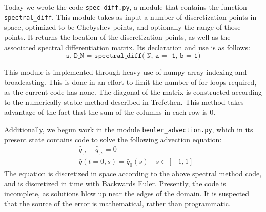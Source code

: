 
Today we wrote the code \texttt{spec\_diff.py}, a module that contains the function \texttt{spectral\_diff}.
This module takes as input a number of discretization points in space, optimized to be Chebyshev points, and optionally the range of those points. 
It returns the location of the discretization points, as well as the associated spectral differentiation matrix.
Its declaration and use is as follows:
$$\texttt{s, D\_N = spectral\_diff( N, a = -1, b = 1)}$$

This module is implemented through heavy use of numpy array indexing and broadcasting. 
This is done in an effort to limit the number of for-loops required, as the current code has none.
The diagonal of the matrix is constructed according to the numerically stable method described in Trefethen.
This method takes advantage of the fact that the sum of the columns in each row is 0.

Additionally, we begun work in the module \texttt{beuler\_advection.py}, which in its present state contains code to solve the following advection equation:
\begin{align*}
	&\hat{q}_{,t} + \hat{q}_{,s} = 0\\
	&\hat{q}(t=0, s) = \hat{q}_0(s) \quad s \in [-1, 1]
\end{align*}
The equation is discretized in space according to the above spectral method code, and is discretized in time with Backwards Euler. 
Presently, the code is incomplete, as solutions blow up near the edges of the domain.
It is suspected that the source of the error is mathematical, rather than programmatic. 
